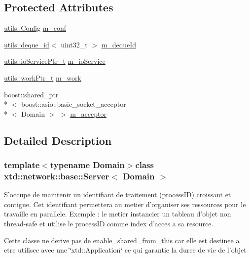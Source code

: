 \subsection*{Protected Attributes}
\begin{DoxyCompactItemize}
\item 
\hyperlink{classxtd_1_1network_1_1utils_1_1Config}{utils\-::\-Config} \hyperlink{classxtd_1_1network_1_1base_1_1Server_a5465aab6a4cbdaa664eeaf9eef6da5ac}{m\-\_\-conf}
\item 
\hyperlink{classxtd_1_1network_1_1utils_1_1deque__id}{utils\-::deque\-\_\-id}$<$ uint32\-\_\-t $>$ \hyperlink{classxtd_1_1network_1_1base_1_1Server_a5092eab162e1e793aaeac42368c5c06f}{m\-\_\-deque\-Id}
\item 
\hyperlink{namespacextd_1_1network_1_1utils_a67dfba91438896976d636d5aea36c848}{utils\-::io\-Service\-Ptr\-\_\-t} \hyperlink{classxtd_1_1network_1_1base_1_1Server_a2b67486dfc934466300fa48295f94b46}{m\-\_\-io\-Service}
\item 
\hyperlink{namespacextd_1_1network_1_1utils_a9e0bae7b0da2b42ca8930a927f3a7c4d}{utils\-::work\-Ptr\-\_\-t} \hyperlink{classxtd_1_1network_1_1base_1_1Server_ad762843698e4e7b4e70974c2daab0932}{m\-\_\-work}
\item 
boost\-::shared\-\_\-ptr\\*
$<$ boost\-::asio\-::basic\-\_\-socket\-\_\-acceptor\\*
$<$ Domain $>$ $>$ \hyperlink{classxtd_1_1network_1_1base_1_1Server_a03e4c0a664c471e756217b20b2209980}{m\-\_\-acceptor}
\end{DoxyCompactItemize}


\subsection{Detailed Description}
\subsubsection*{template$<$typename Domain$>$class xtd\-::network\-::base\-::\-Server$<$ Domain $>$}


\begin{DoxyEnumerate}
\item S'occupe de maintenir un identifiant de traitement (process\-I\-D) croissant et contigue. Cet identifiant permettera au metier d'organiser ses ressources pour le travaille en parallele. Exemple \-: le metier instancier un tableau d'objet non thread-\/safe et utilise le process\-I\-D comme index d'acces a sa resource.
\item Cette classe ne derive pas de enable\-\_\-shared\-\_\-from\-\_\-this car elle est destinee a etre utilisee avec une \char`\"{}xtd\-::\-Application\char`\"{} ce qui garantie la duree de vie de l'objet 
\end{DoxyEnumerate}


